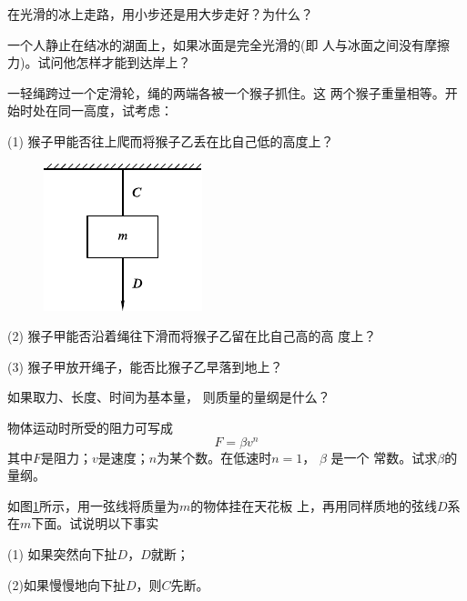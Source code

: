 \begin{questions}
  \question 在光滑的冰上走路，用小步还是用大步走好？为什么？

  \question 一个人静止在结冰的湖面上，如果冰面是完全光滑的(即
  人与冰面之间没有摩擦力)。试问他怎样才能到达岸上？

  \question 一轻绳跨过一个定滑轮，绳的两端各被一个猴子抓住。这
  两个猴子重量相等。开始时处在同一高度，试考虑：

  (1) 猴子甲能否往上爬而将猴子乙丢在比自己低的高度上？

  \begin{figure}
    \centering
    \includegraphics{figure/fig03.21}
    \caption{}
    \label{fig:03.21}
  \end{figure}
  (2) 猴子甲能否沿着绳往下滑而将猴子乙留在比自己高的高
  度上？

  (3) 猴子甲放开绳子，能否比猴子乙早落到地上？

  \question 如果取力、长度、时间为基本量，
  则质量的量纲是什么？

  \question 物体运动时所受的阻力可写成
  \begin{equation*}
    F = \beta v ^ n
  \end{equation*}
  其中$ F $是阻力；$ v $是速度；$ n $为某个数。在低速时$ n = 1 $， $ \beta $ 是一个
  常数。试求$ \beta $的量纲。

  \question 如图\ref{fig:03.21}所示，用一弦线将质量为$ m $的物体挂在天花板
  上，再用同样质地的弦线$ D $系在$ m $下面。试说明以下事实

  (1) 如果突然向下扯$ D $，$ D $就断；

  (2)如果慢慢地向下扯$ D $，则$ C $先断。
\end{questions}



